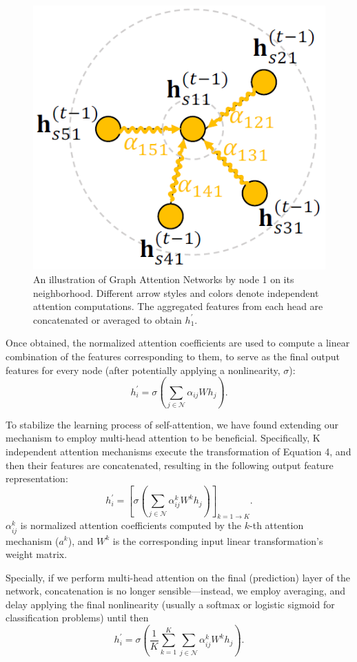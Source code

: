 \documentclass[10pt,journal,compsoc]{IEEEtran}
\begin{document}
\begin{figure}[t]
  \centering
  \includegraphics[width=0.4\linewidth]{assets/gats}
  \caption{An illustration of Graph Attention Networks by node 1 on its neighborhood. Different arrow styles and colors denote independent attention computations. The aggregated features from each head are concatenated or averaged to obtain $h_1^{\prime}$.}
  \label{f:gats}
\end{figure}

Once obtained, the normalized attention coefficients are used to compute a linear combination of the features corresponding to them, to serve as the final output features for every node (after potentially applying a nonlinearity, $\sigma$):
\begin{equation}
  h_i^{\prime} = \sigma\left(\sum_{j \in \mathcal{N}} \alpha_{ij}Wh_j\right).
\end{equation}

To stabilize the learning process of self-attention, we have found extending our mechanism to employ multi-head attention to be beneficial. Specifically, K independent attention mechanisms execute the transformation of Equation 4, and then their features are concatenated, resulting in the following output feature representation:
\begin{equation}
  h_i^{\prime} = \left[\sigma\left(\sum_{j \in \mathcal{N}} \alpha_{ij}^kW^kh_j\right)\right]_{k=1 \to K}.
\end{equation}
$\alpha_{ij}^k$ is normalized attention coefficients computed by the $k$-th attention mechanism ($a^k$), and $W^k$ is the corresponding input linear transformation's weight matrix.

Specially, if we perform multi-head attention on the final (prediction) layer of the network, concatenation is no longer sensible—instead, we employ averaging, and delay applying the final nonlinearity (usually a softmax or logistic sigmoid for classification problems) until then
\begin{equation}
  h_i^{\prime} = \sigma\left(\frac{1}{K}\sum_{k=1}^K\sum_{j \in \mathcal{N}} \alpha_{ij}^kW^kh_j\right).
\end{equation}
\end{document}

